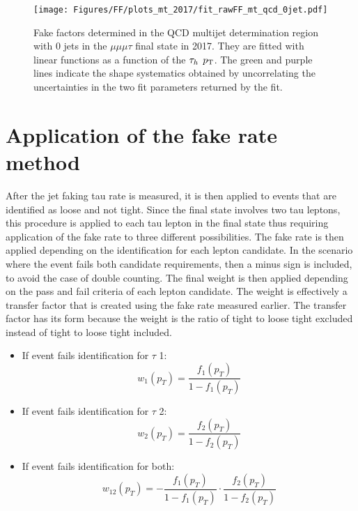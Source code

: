 \begin{figure}[ht!b]
\centering
\texttt{[image: Figures/FF/plots\_mt\_2017/fit\_rawFF\_mt\_qcd\_0jet.pdf]}\\
\caption{\label{fig:fit_raw_mt_0jet_qcd} Fake factors determined in the QCD multijet determination region with 0 jets in the $\mu\mu\mu\tau$ final state in 2017. They are fitted with linear functions as a function of the $\tau_h$ $p_{\mathrm{T}}$. The green and purple lines indicate the shape systematics obtained by uncorrelating the uncertainties in the two fit parameters returned by the fit.  }
\end{figure}





\clearpage

\section{Application of the fake rate method}

After the jet faking tau rate is measured, it is then applied to events that are identified as loose and not tight. Since the final state involves two tau leptons, this procedure is applied to each tau lepton in the final state thus requiring application of the fake rate to three different possibilities. The fake rate is then applied depending on the identification for each lepton candidate. In the scenario where the event fails both candidate requirements, then a minus sign is included, to avoid the case of double counting.  
The final weight is then applied depending on the pass and fail criteria of each lepton candidate. The weight is effectively a transfer factor that is created using the fake rate measured earlier. The transfer factor has its form because the weight is the ratio of tight to loose tight excluded instead of tight to loose tight included. 
\begin{itemize}
\item{If event fails identification for $\tau$ 1:\begin{equation}w_1(p_T)=\frac{f_{1}(p_T)}{1-f_{1}(p_T)}\end{equation}}
\item{If event fails identification for $\tau$ 2:\begin{equation}w_2(p_T)=\frac{f_{2}(p_T)}{1-f_{2}(p_T)}\end{equation}}
\item{If event fails identification for both:\begin{equation}w_{12}(p_T)=-\frac{f_{1}(p_T)}{1-f_{1}(p_T)}\cdot\frac{f_{2}(p_T)}{1-f_{2}(p_T)}\end{equation}}
\end{itemize}


